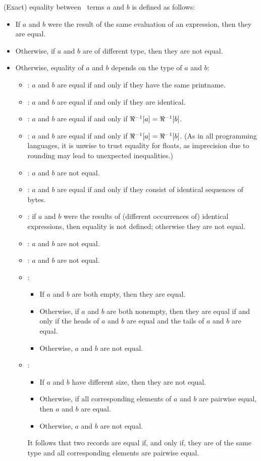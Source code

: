 (Exact) equality between \Erlang\ terms $a$ and $b$ is defined as follows:
\begin{itemize}
\item If $a$ and $b$ were the result of the same evaluation of an expression, then
they are equal.
\item Otherwise, if $a$ and $b$ are of different type, then they are not equal.
\item Otherwise, equality of $a$ and $b$ depends on the type of $a$ and $b$:
\begin{itemize}
\item {}:  $a$ and $b$ are equal if and only
if they have the same printname.
\ifStd
\item {}:  $a$ and $b$ are equal if and only if they are identical.
\fi
\item {}: $a$ and $b$ are equal if and only if $\Re^{-1}[a]=\Re^{-1}[b]$.
\item {}: $a$ and $b$ are equal if and only if $\Re^{-1}[a]=\Re^{-1}[b]$.
(As in all programming languages, it is unwise to trust equality for
floats, as imprecision due to rounding may lead to unexpected inequalities.)
\item {}: $a$ and $b$ are not equal.
\item {}: $a$ and $b$ are equal if and only
if they consist of identical sequences of bytes.
\ifStd
\item {}: if $a$ and $b$ were the results of (different occurrences of)
identical expressions, then equality is not defined; otherwise they are not equal.
\fi
\item {}: $a$ and $b$ are not equal.
\item {}: $a$ and $b$ are not equal.
\item {}:
\begin{itemize}
\item If $a$ and $b$ are both empty, then they are equal.
\item Otherwise, if $a$ and $b$ are both nonempty, then they are equal if and only if
the heads of $a$ and $b$ are equal and the tails of $a$ and $b$ are equal.
\item Otherwise, $a$ and $b$ are not equal.
\end{itemize}
\item {}:
\begin{itemize}
\item If $a$ and $b$ have different size, then they are not equal.
\item Otherwise, if all corresponding elements of $a$ and $b$ are pairwise
equal, then $a$ and $b$ are equal.
\item Otherwise, $a$ and $b$ are not equal.
\end{itemize}
It follows that two records are equal
if, and only if, they are of the same type and all corresponding elements are
pairwise equal.


\end{itemize}
\end{itemize}
